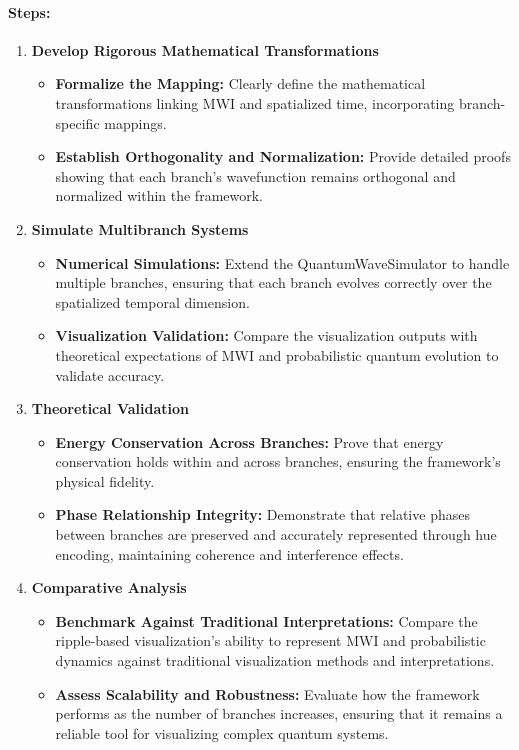 \documentclass[12pt]{article}
\begin{document}
\paragraph{Steps:}
\begin{enumerate}
    \item \textbf{Develop Rigorous Mathematical Transformations}
    \begin{itemize}
        \item \textbf{Formalize the Mapping:} Clearly define the mathematical transformations linking MWI and spatialized time, incorporating branch-specific mappings.
        
        \item \textbf{Establish Orthogonality and Normalization:} Provide detailed proofs showing that each branch’s wavefunction remains orthogonal and normalized within the framework.
    \end{itemize}
    
    \item \textbf{Simulate Multibranch Systems}
    \begin{itemize}
        \item \textbf{Numerical Simulations:} Extend the QuantumWaveSimulator to handle multiple branches, ensuring that each branch evolves correctly over the spatialized temporal dimension.
        
        \item \textbf{Visualization Validation:} Compare the visualization outputs with theoretical expectations of MWI and probabilistic quantum evolution to validate accuracy.
    \end{itemize}
    
    \item \textbf{Theoretical Validation}
    \begin{itemize}
        \item \textbf{Energy Conservation Across Branches:} Prove that energy conservation holds within and across branches, ensuring the framework’s physical fidelity.
        
        \item \textbf{Phase Relationship Integrity:} Demonstrate that relative phases between branches are preserved and accurately represented through hue encoding, maintaining coherence and interference effects.
    \end{itemize}
    
    \item \textbf{Comparative Analysis}
    \begin{itemize}
        \item \textbf{Benchmark Against Traditional Interpretations:} Compare the ripple-based visualization’s ability to represent MWI and probabilistic dynamics against traditional visualization methods and interpretations.
        
        \item \textbf{Assess Scalability and Robustness:} Evaluate how the framework performs as the number of branches increases, ensuring that it remains a reliable tool for visualizing complex quantum systems.
    \end{itemize}
\end{enumerate}
\end{document}
